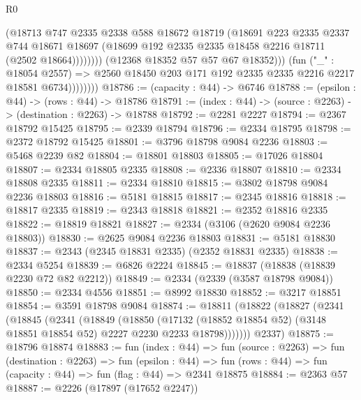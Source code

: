 \begin{lexlean}{R0}
\begin{coremodule}
                              (@18713
                                @747
                                @2335
                                @2338
                                @588
                                @18672
                                @18719
                                (@18691
                                  @223
                                  @2335
                                  @2337
                                  @744
                                  @18671
                                  @18697
                                  (@18699 @192 @2335 @2335 @18458 @2216 @18711 (@2502 @18664))))))))
                      (@12368 @18352 @57 @57 @67 @18352)))
                  (fun ("_" : @18054 @2557) =>
                  @2560 @18450 @203 @171 @192 @2335 @2335 @2216 @2217 @18581 @6734))))))))
@18786 := (capacity : @44) -> @6746
@18788 := (epsilon : @44) -> (rows : @44) -> @18786
@18791 := (index : @44) -> (source : @2263) -> (destination : @2263) -> @18788
@18792 := @2281 @2227
@18794 := @2367 @18792 @15425
@18795 := @2339 @18794
@18796 := @2334 @18795
@18798 := @2372 @18792 @15425
@18801 := @3796 @18798 @9084 @2236
@18803 := @5468 @2239 @82
@18804 := @18801 @18803
@18805 := @17026 @18804
@18807 := @2334 @18805 @2335
@18808 := @2336 @18807
@18810 := @2334 @18808 @2335
@18811 := @2334 @18810
@18815 := @3802 @18798 @9084 @2236 @18803
@18816 := @5181 @18815
@18817 := @2345 @18816
@18818 := @18817 @2335
@18819 := @2343 @18818
@18821 := @2352 @18816 @2335
@18822 := @18819 @18821
@18827 := @2334 (@3106 (@2620 @9084 @2236 @18803))
@18830 := @2625 @9084 @2236 @18803
@18831 := @5181 @18830
@18837 := @2343 (@2345 @18831 @2335) (@2352 @18831 @2335)
@18838 := @2334 @5254
@18839 := @6826 @2224
@18845 := @18837 (@18838 (@18839 @2230 @72 @82 @2212))
@18849 := @2334 (@2339 (@3587 @18798 @9084))
@18850 := @2334 @4556
@18851 := @8992 @18830
@18852 := @3217 @18851
@18854 := @3591 @18798 @9084
@18874 := @18811
    (@18822
      (@18827
        (@2341
          (@18845
            (@2341
              (@18849
                (@18850
                  (@17132
                    (@18852 @18854 @52)
                    (@3148 @18851 @18854 @52)
                    @2227
                    @2230
                    @2233
                    @18798)))))))
      @2337)
@18875 := @18796 @18874
@18883 := fun (index : @44) =>
  fun (source : @2263) =>
  fun (destination : @2263) =>
  fun (epsilon : @44) =>
  fun (rows : @44) => fun (capacity : @44) => fun (flag : @44) => @2341 @18875
@18884 := @2363 @57
@18887 := @2226 (@17897 (@17652 @2247))

\end{coremodule}
\end{lexlean}
